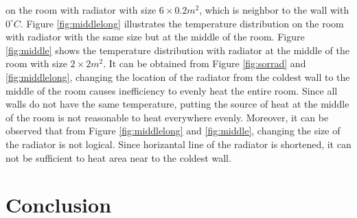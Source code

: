\documentclass[letterpaper,12pt]{article}
\begin{document}
on the room with radiator with size $6\times0.2 m^2$, which is
neighbor to the wall with $0^\circ C$. Figure \ref{fig:middlelong} illustrates the
temperature distribution on the room with radiator with the same size but at
the middle of the room. Figure \ref{fig:middle} shows the temperature
distribution with radiator at the middle of the room with size $2\times2 m^2$.
It can be obtained from Figure \ref{fig:sorrad} and \ref{fig:middlelong},
changing the location of the radiator from the coldest wall to the middle
of the room causes inefficiency to evenly heat the entire room. Since all walls do not have
the same temperature, putting the source of heat at the middle of the room
is not reasonable to heat everywhere evenly. Moreover, it can be observed that from Figure
\ref{fig:middlelong} and \ref{fig:middle}, changing the size of the radiator is not logical.
Since horizantal line of the radiator is shortened, it can not be sufficient to heat area near to
the coldest wall. 



\section{Conclusion}
\end{document}
